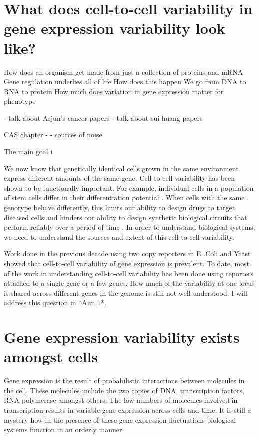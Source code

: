 \section {What does cell-to-cell variability in gene expression variability look like?}

How does an organism get made from just a collection of proteins and mRNA
Gene regulation underlies all of life
How does this happen
We go from DNA to RNA to protein
How much does variation in gene expression matter for phenotype

- talk about Arjun's cancer papers
- talk about sui huang papers


CAS chapter - - sources of noise



The main goal i     

We now know that genetically identical cells grown in the same environment express different amounts of the same gene. Cell-to-cell variability has been shown to be functionally important. For example, individual cells in a population of stem cells differ in their differentiation potential \cite{chang_transcriptome-wide_2008}. When cells with the same genotype behave differently, this limits our ability to design drugs to target diseased cells and hinders our ability to design synthetic biological circuits that perform reliably over a period of time \cite{elowitz_synthetic_2000}. In order to understand biological systems, we need to understand the sources and extent of this cell-to-cell variability.

Work done in the previous decade using two copy reporters in E. Coli \cite{elowitz_stochastic_2002} and Yeast \cite{raser_control_2004} showed that cell-to-cell variability of gene expression is prevalent. To date, most of the work in understanding cell-to-cell variability has been done using reporters attached to a single gene or a few genes. How much of the variability at one locus is shared across different genes in the genome is still not well understood. I will address this question in *Aim 1*.


\section{Gene expression variability exists amongst cells}

Gene expression is the result of probabilistic interactions between molecules in the cell. These molecules include the two copies of DNA, transcription factors, RNA polymerase amongst others. The low numbers of molecules involved in transcription results in  variable gene expression across cells and time. It is still a mystery how in the presence of these gene expression fluctuations biological systems function in an orderly manner.

